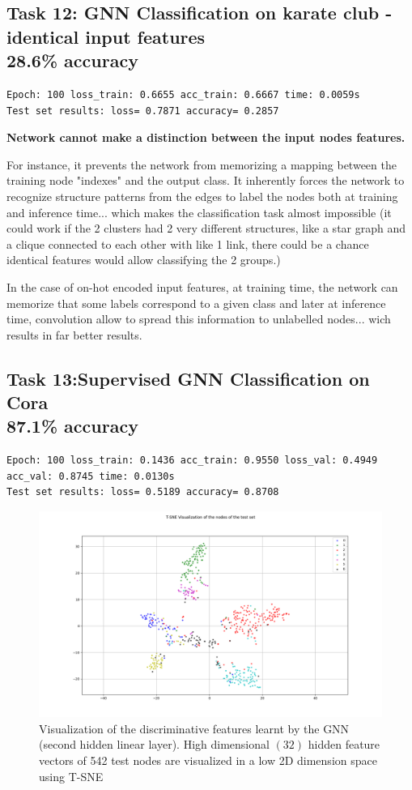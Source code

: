 \documentclass[a4paper]{article}
\begin{document}
\subsection*{Task 12: GNN Classification on karate club - identical input features \\ 28.6\% accuracy}
\begin{verbatim}
Epoch: 100 loss_train: 0.6655 acc_train: 0.6667 time: 0.0059s
Test set results: loss= 0.7871 accuracy= 0.2857
\end{verbatim}  
\textbf{Network cannot make a distinction between the input nodes features.}

For instance, it prevents the network from memorizing a mapping between the training node "indexes" and the output class.
It inherently forces the network to recognize structure patterns from the edges to label the nodes both at training and inference time...
which makes the classification task almost impossible 
(it could work if the 2 clusters had 2 very different structures, like a star graph and a clique connected to each other with like 1 link,
there could be a chance identical features would allow classifying the 2 groups.)

In the case of on-hot encoded input features, at training time, the network can memorize that some labels correspond
to a given class and later at inference time, convolution allow to spread this information to unlabelled nodes...
wich results in far better results.



\subsection*{Task 13:Supervised GNN Classification on Cora \\ 87.1\% accuracy}
\begin{verbatim}
Epoch: 100 loss_train: 0.1436 acc_train: 0.9550 loss_val: 0.4949 acc_val: 0.8745 time: 0.0130s
Test set results: loss= 0.5189 accuracy= 0.8708
\end{verbatim}


\begin{figure}[ht]
    \centering
    \includegraphics[width=1.\textwidth]{figures/tSNE_Cora.png}
    \caption{Visualization of the discriminative features learnt by the GNN (second hidden linear layer). 
    High dimensional $(32)$ hidden feature vectors of 542 test nodes are visualized in a low 2D dimension space using T-SNE}
    \label{fig:tsne_cora}
\end{figure}
\end{document}
